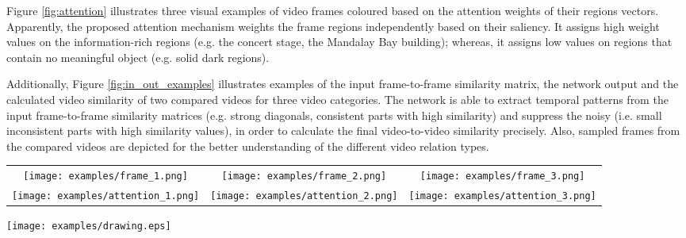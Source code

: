 \documentclass[10pt,twocolumn,letterpaper]{article}
\begin{document}
Figure \ref{fig:attention} illustrates three visual examples of video frames coloured based on the attention weights of their regions vectors. Apparently, the proposed attention mechanism weights the frame regions independently based on their saliency. It assigns high weight values on the information-rich regions (e.g. the concert stage, the Mandalay Bay building); whereas, it assigns low values on regions that contain no meaningful object (e.g. solid dark regions). 

Additionally, Figure \ref{fig:in_out_examples} illustrates examples of the input frame-to-frame similarity matrix, the network output and the calculated video similarity of two compared videos for three video categories. The network is able to extract temporal patterns from the input frame-to-frame similarity matrices (e.g. strong diagonals, consistent parts with high similarity) and suppress the noisy (i.e. small inconsistent parts with high similarity values), in order to calculate the final video-to-video similarity precisely. Also, sampled frames from the compared videos are depicted for the better understanding of the different video relation types.

\begin{figure*}[t]
\centering
  \begin{tabular}{ccc}
    \texttt{[image: examples/frame\_1.png]} & \texttt{[image: examples/frame\_2.png]} & \texttt{[image: examples/frame\_3.png]} \\
    \texttt{[image: examples/attention\_1.png]} & \texttt{[image: examples/attention\_2.png]} &
    \texttt{[image: examples/attention\_3.png]}
  \end{tabular}
\caption{Examples of the attention weighting on arbitrary video frames: sampled video frames from the same video (top), attention maps of the corresponding frames (bottom). Red colour indicates high attention weights, whereas blue indicates low ones.}
\vspace{0.1cm}
\label{fig:attention}
\end{figure*}

\begin{figure*}[t]
\flushleft
\texttt{[image: examples/drawing.eps]}
\vspace{0.2cm}
\caption{Visual examples of the input and output of ViSiL for three different video relation types. Two sampled frames of the compared videos are depicted on top, then the input frame-to-frame similarity matrix and the ViSiL output are displayed, and the final video-to-video similarity is reported. In the similarity matrices, red colour indicates a high similarity score, whereas blue indicates low similarity.}
\label{fig:in_out_examples}
\end{figure*}
\end{document}

